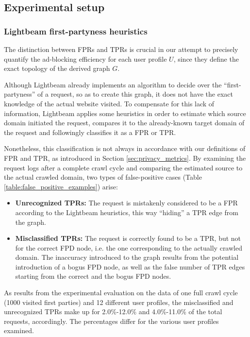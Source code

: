 \documentclass{sig-alternate}
\begin{document}
\subsection{Experimental setup}
\subsubsection{Lightbeam first-partyness heuristics}
The distinction between FPRs and TPRs is crucial in our attempt to precisely quantify the ad-blocking efficiency for each user profile $U$, since they define the exact topology of the derived graph $G$.

Although Lightbeam already implements an algorithm to decide over the ``first-partyness'' of a request, so as to create this graph, it does not have the exact knowledge of the actual website visited. To compensate for this lack of information, Lightbeam applies some heuristics in order to estimate which source domain initiated the request, compares it to the already-known target domain of the request and followingly classifies it as a FPR or TPR.

Nonetheless, this classification is not always in accordance with our definitions of FPR and TPR, as introduced in Section \ref{sec:privacy_metrics}. By examining the request logs after a complete crawl cycle and comparing the estimated source to the actual crawled domain, two types of false-positive cases (Table \ref{table:false_positive_examples}) arise:

\begin{itemize}
\item \textbf{Unrecognized TPRs:} The request is mistakenly considered to be a FPR according to the Lightbeam heuristics, this way ``hiding'' a TPR edge from the graph.
\item \textbf{Misclassified TPRs:} The request is correctly found to be a TPR, but not for the correct FPD node, i.e. the one corresponding to the actually crawled domain. The inaccuracy introduced to the graph results from the potential introduction of a bogus FPD node, as well as the false number of TPR edges starting from the correct and the bogus FPD nodes.
\end{itemize}

As results from the experimental evaluation on the data of one full crawl cycle (1000 visited first parties) and 12 different user profiles, the misclassified and unrecognized TPRs make up for 2.0\%-12.0\% and 4.0\%-11.0\% of the total requests, accordingly. The percentages differ for the various user profiles examined.
\end{document}
